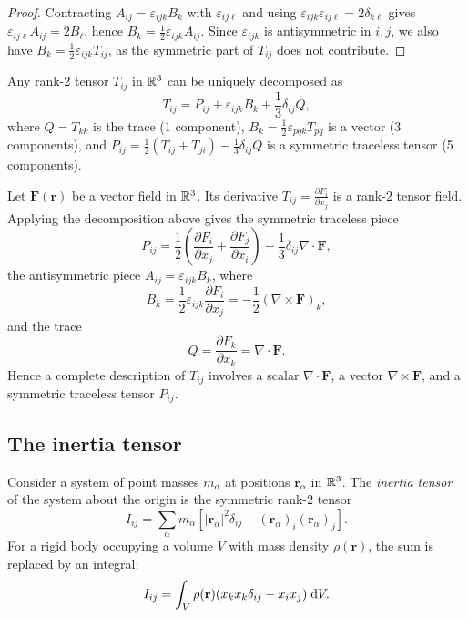 \documentclass[a4paper]{article}
\begin{document}
\begin{proof}
  Contracting $A_{ij} = \varepsilon_{ijk}B_k$ with $\varepsilon_{ij\ell}$ and using $\varepsilon_{ijk}\varepsilon_{ij\ell} = 2\delta_{k\ell}$ gives $\varepsilon_{ij\ell}A_{ij} = 2B_\ell$, hence $B_k = \frac{1}{2}\varepsilon_{ijk}A_{ij}$. Since $\varepsilon_{ijk}$ is antisymmetric in $i,j$, we also have $B_k = \frac{1}{2}\varepsilon_{ijk}T_{ij}$, as the symmetric part of $T_{ij}$ does not contribute.
\end{proof}

\begin{thm}
  Any rank-2 tensor $T_{ij}$ in $\mathbb{R}^3$ can be uniquely decomposed as
  \[
    T_{ij} = P_{ij} + \varepsilon_{ijk}B_k + \frac{1}{3}\delta_{ij}Q,
  \]
  where $Q = T_{kk}$ is the trace (1 component), $B_k = \frac{1}{2}\varepsilon_{pqk} T_{pq}$ is a vector (3 components), and $P_{ij} = \frac{1}{2}(T_{ij} + T_{ji}) - \frac{1}{3}\delta_{ij}Q$ is a symmetric traceless tensor (5 components).
\end{thm}

\begin{eg}
  Let $\mathbf{F}(\mathbf{r})$ be a vector field in $\mathbb{R}^3$. Its derivative $T_{ij} = \frac{\partial F_i}{\partial x_j}$ is a rank-2 tensor field. Applying the decomposition above gives the symmetric traceless piece
  \[
    P_{ij} = \frac{1}{2}\left(\frac{\partial F_i}{\partial x_j} + \frac{\partial F_j}{\partial x_i}\right) - \frac{1}{3}\delta_{ij}\nabla\cdot \mathbf{F},
  \]
  the antisymmetric piece $A_{ij} = \varepsilon_{ijk}B_k$, where
  \[
    B_k = \frac{1}{2}\varepsilon_{ijk}\frac{\partial F_i}{\partial x_j} = -\frac{1}{2}(\nabla\times \mathbf{F})_k,
  \]
  and the trace
  \[
    Q = \frac{\partial F_k}{\partial x_k} = \nabla \cdot \mathbf{F}.
  \]
  Hence a complete description of $T_{ij}$ involves a scalar $\nabla\cdot \mathbf{F}$, a vector $\nabla\times \mathbf{F}$, and a symmetric traceless tensor $P_{ij}$.
\end{eg}

\subsection{The inertia tensor}

\begin{defi}
  Consider a system of point masses $m_\alpha$ at positions $\mathbf{r}_\alpha$ in $\mathbb{R}^3$. The \emph{inertia tensor} of the system about the origin is the symmetric rank-2 tensor
  \[
    I_{ij} = \sum_\alpha m_\alpha [|\mathbf{r}_\alpha|^2 \delta_{ij} - (\mathbf{r}_\alpha)_i (\mathbf{r}_\alpha)_j].
  \]
  For a rigid body occupying a volume $V$ with mass density $\rho(\mathbf{r})$, the sum is replaced by an integral:
  \[
    I_{ij} = \int_V \rho (\mathbf{r})(x_kx_k \delta_{ij} - x_i x_j)\;\mathrm{d} V.
  \]
\end{defi}
\end{document}
